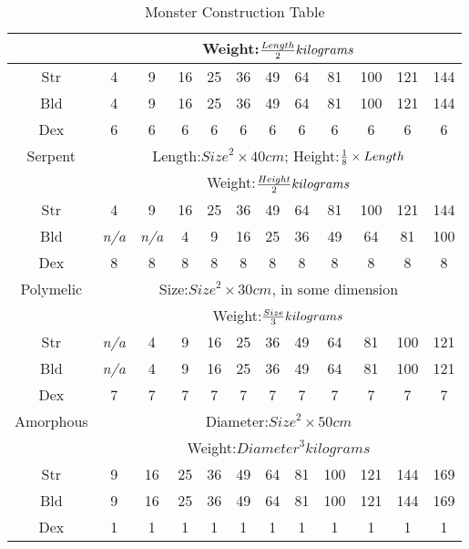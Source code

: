 \documentclass[twoside]{book}
\begin{document}
\begin{table}[!htb]
\begin{center}
\begin{tabular}{|c|c|c|c|c|c|c|c|c|c|c|c|}
&
\multicolumn{11}{c}{
            Weight:\begin{math}{{Length}\over{2}}kilograms\end{math}}\\
\hline
Str&4&9&16&25&36&49&64&81&100&121&144\\
\hline
Bld&4&9&16&25&36&49&64&81&100&121&144\\
\hline
Dex&6&6&6&6&6&6&6&6&6&6&6\\
\hline
Serpent&
\multicolumn{11}{c}{
            Length:\begin{math}{Size}^{2}\times 40cm\end{math}; Height:\begin{math}{{1}\over{8}}\times Length\end{math}}\\
&
\multicolumn{11}{c}{
            Weight:\begin{math}{{Height}\over{2}}kilograms\end{math}}\\
\hline
Str&4&9&16&25&36&49&64&81&100&121&144\\
\hline
Bld&\textit{n/a}&\textit{n/a}&4&9&16&25&36&49&64&81&100\\
\hline
Dex&8&8&8&8&8&8&8&8&8&8&8\\
\hline
Polymelic&
\multicolumn{11}{c}{
            Size:\begin{math}{Size}^{2}\times 30cm\end{math}, in some dimension}\\
&
\multicolumn{11}{c}{
            Weight:\begin{math}{{Size}\over{3}}kilograms\end{math}}\\
\hline
Str&\textit{n/a}&4&9&16&25&36&49&64&81&100&121\\
\hline
Bld&\textit{n/a}&4&9&16&25&36&49&64&81&100&121\\
\hline
Dex&7&7&7&7&7&7&7&7&7&7&7\\
\hline
Amorphous&
\multicolumn{11}{c}{
            Diameter:\begin{math}{Size}^{2}\times 50cm\end{math}}\\
&
\multicolumn{11}{c}{
            Weight:\begin{math}{Diameter}^{3}kilograms\end{math}}\\
\hline
Str&9&16&25&36&49&64&81&100&121&144&169\\
\hline
Bld&9&16&25&36&49&64&81&100&121&144&169\\
\hline
Dex&1&1&1&1&1&1&1&1&1&1&1\\
\hline

  \end{tabular}
  
\caption{Monster Construction Table}
  
  \end{center}
\end{table}
  
\end{document}
